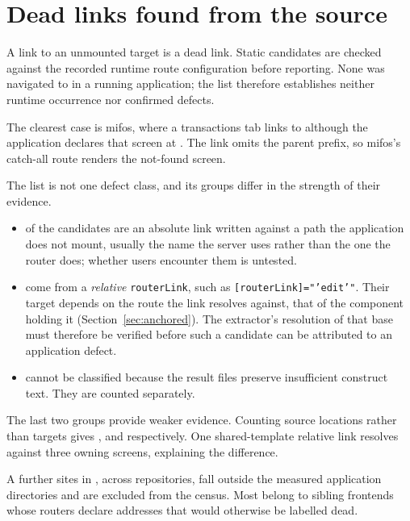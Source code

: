 \clearpage
\section{Dead links found from the source}
\label{sec:deadlinks}

A link to an unmounted target is a dead link. Static candidates are checked against the recorded
runtime route configuration before reporting. None was navigated to in a running application;
the list therefore establishes neither runtime occurrence nor confirmed defects.

{\sloppy The clearest case is mifos, where a transactions tab links to \allowbreak{} although the application declares that screen at
\allowbreak{}\allowbreak{}. The link omits the parent
prefix, so mifos's catch-all route renders the not-found screen.\par}

The list is not one defect class, and its groups differ in the strength of their evidence.

\begin{itemize}
\item \RoundTwoDeadLinkAbsolute{} of the candidates are an absolute link written against a path the
application does not mount, usually the name the server uses rather than the one the router does; whether users encounter
them is untested.
\item \RoundTwoDeadLinkRelative{} come from a \emph{relative} \texttt{routerLink}, such as
\texttt{[routerLink]="'edit'"}. Their target
depends on the route the link resolves against, that of the component holding it
(Section~\ref{sec:anchored}). The extractor's resolution of that base must therefore be verified
before such a candidate can be attributed to an application defect.
\item \RoundTwoDeadLinkBaseUnknown{} cannot be classified because the result files preserve
insufficient construct text. They are counted separately.
\end{itemize}

The last two groups provide weaker evidence. Counting source locations rather than targets gives
\RoundTwoDeadLinkAbsoluteLocations{}, \RoundTwoDeadLinkRelativeLocations{} and
\RoundTwoDeadLinkBaseUnknownLocations{} respectively. One shared-template relative link resolves
against three owning screens, explaining the difference.

A further \RoundTwoOutsideDirSites{} sites in \RoundTwoOutsideDirWhere{}, across
\RoundTwoOutsideDirApps{} repositories, fall outside the measured application directories and are
excluded from the census. Most belong to sibling frontends whose routers declare addresses that
would otherwise be labelled dead.
